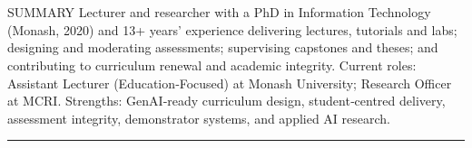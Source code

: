\documentclass{my_cv}
\begin{document}


\section{\faFileText}{SUMMARY}
Lecturer and researcher with a PhD in Information Technology (Monash, 2020) and 13+ years’ experience delivering lectures, tutorials and labs; designing and moderating assessments; supervising capstones and theses; and contributing to curriculum renewal and academic integrity. Current roles: Assistant Lecturer (Education‑Focused) at Monash University; Research Officer at MCRI. Strengths: GenAI‑ready curriculum design, student‑centred delivery, assessment integrity, demonstrator systems, and applied AI research.









% 






% 

% 




















\noindent\rule{18.75cm}{0.6pt}
\vspace{20pt}


\end{document}
